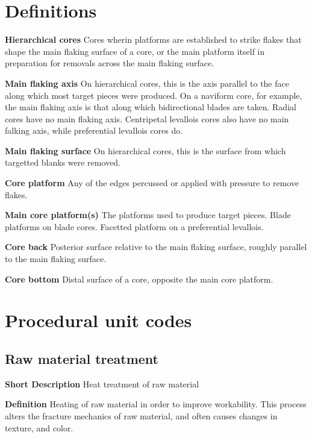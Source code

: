 \documentclass[
]{article}
\begin{document}
\hypertarget{definitions}{%
\section{Definitions}\label{definitions}}

\textbf{Hierarchical cores} Cores wherin platforms are established to
strike flakes that shape the main flaking surface of a core, or the main
platform itself in preparation for removals across the main flaking
surface.

\textbf{Main flaking axis} On hierarchical cores, this is the axis
parallel to the face along which most target pieces were produced. On a
naviform core, for example, the main flaking axis is that along which
bidirectional blades are taken. Radial cores have no main flaking axis.
Centripetal levallois cores also have no main falking axis, while
preferential levallois cores do.

\textbf{Main flaking surface} On hierarchical cores, this is the surface
from which targetted blanks were removed.

\textbf{Core platform} Any of the edges percussed or applied with
pressure to remove flakes.

\textbf{Main core platform(s)} The platforms used to produce target
pieces. Blade platforms on blade cores. Facetted platform on a
preferential levallois.

\textbf{Core back} Posterior surface relative to the main flaking
surface, roughly parallel to the main flaking surface.

\textbf{Core bottom} Distal surface of a core, opposite the main core
platform.

\hypertarget{procedural-unit-codes}{%
\section{Procedural unit codes}\label{procedural-unit-codes}}

\hypertarget{raw-material-treatment}{%
\subsection{Raw material treatment}\label{raw-material-treatment}}

\textbf{Short Description} Heat treatment of raw material

\textbf{Definition} Heating of raw material in order to improve
workability. This process alters the fracture mechanics of raw material,
and often causes changes in texture, and color.
\end{document}
